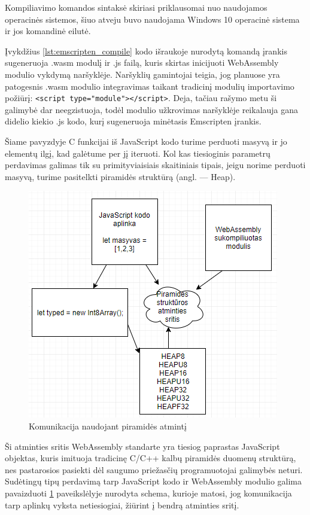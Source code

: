 \documentclass{VUMIFPSkursinis}
\begin{document}
Kompiliavimo komandos sintaksė skiriasi priklausomai nuo naudojamos operacinės sistemos, šiuo atveju buvo naudojama Windows 10 operacinė sistema ir jos komandinė eilutė.

Įvykdžius \ref{lst:emscripten_compile} kodo išraukoje nurodytą komandą įrankis sugeneruoja .wasm modulį ir .js failą, kuris skirtas inicijuoti WebAssembly modulio vykdymą naršyklėje. Naršyklių gamintojai teigia, jog planuose yra patogesnis .wasm modulio integravimas taikant tradicinį modulių importavimo požiūrį: \lstinline[columns=fixed]{<script type="module"></script>}. Deja, tačiau rašymo metu ši galimybė dar neegzistuoja, todėl modulio užkrovimas naršyklėje reikalauja gana didelio kiekio .js kodo, kurį sugeneruoja minėtasis Emscripten įrankis.

Šiame pavyzdyje C funkcijai iš JavaScript kodo turime perduoti masyvą ir jo elementų ilgį, kad galėtume per jį iteruoti. Kol kas tiesioginis parametrų perdavimas galimas tik su primityviaisiais skaitiniais tipais, jeigu norime perduoti masyvą, turime pasitelkti piramidės struktūrą (angl. — Heap). 
\begin{figure}[h!]
  \begin{center}
  \includegraphics[scale=0.7]{wasm_heap.png}
  \end{center}
  \caption{Komunikacija naudojant piramidės atmintį}
  \label{fig:wasm_stack}
\end{figure}
Ši atminties sritis WebAssembly standarte yra tiesiog paprastas JavaScript objektas, kuris imituoja tradicinę C/C++ kalbų piramidės duomenų struktūrą, nes pastarosios pasiekti dėl saugumo priežasčių programuotojai galimybės neturi. 
Sudėtingų tipų perdavimą tarp JavaScript kodo ir WebAssembly modulio galima pavaizduoti \ref{fig:wasm_stack} paveikslėlyje nurodyta schema, kurioje matosi, jog komunikacija tarp aplinkų vyksta netiesiogiai, žiūrint į bendrą atminties sritį.
\end{document}
